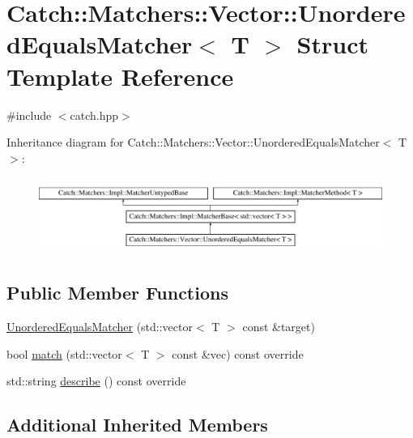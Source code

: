 \hypertarget{struct_catch_1_1_matchers_1_1_vector_1_1_unordered_equals_matcher}{}\section{Catch\+:\+:Matchers\+:\+:Vector\+:\+:Unordered\+Equals\+Matcher$<$ T $>$ Struct Template Reference}
\label{struct_catch_1_1_matchers_1_1_vector_1_1_unordered_equals_matcher}


{\ttfamily \#include $<$catch.\+hpp$>$}

Inheritance diagram for Catch\+:\+:Matchers\+:\+:Vector\+:\+:Unordered\+Equals\+Matcher$<$ T $>$\+:\begin{figure}[H]
\begin{center}
\leavevmode
\includegraphics[height=2.492581cm]{struct_catch_1_1_matchers_1_1_vector_1_1_unordered_equals_matcher}
\end{center}
\end{figure}
\subsection*{Public Member Functions}
\begin{DoxyCompactItemize}
\item 
\mbox{\hyperlink{struct_catch_1_1_matchers_1_1_vector_1_1_unordered_equals_matcher_a525905639b2b15b52ddb0bf14bfa19da}{Unordered\+Equals\+Matcher}} (std\+::vector$<$ T $>$ const \&target)
\item 
bool \mbox{\hyperlink{struct_catch_1_1_matchers_1_1_vector_1_1_unordered_equals_matcher_a3ccdd9dd2cd8bdbb8bb121acbb9cb358}{match}} (std\+::vector$<$ T $>$ const \&vec) const override
\item 
std\+::string \mbox{\hyperlink{struct_catch_1_1_matchers_1_1_vector_1_1_unordered_equals_matcher_a7202d811200317abc58c844f663823df}{describe}} () const override
\end{DoxyCompactItemize}
\subsection*{Additional Inherited Members}



